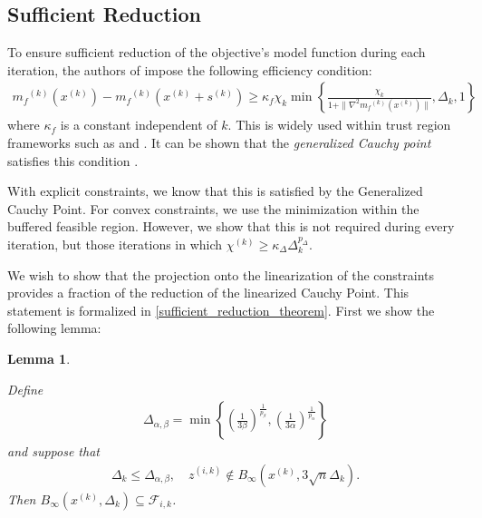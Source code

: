 \documentclass{article}
\newtheorem{lemma}[theorem]{Lemma}
\theoremstyle{case}
\newcommand{\chik}{{\chi^{(k)}}}
\newcommand{\deltalargzik}{{\Delta_{\alpha,\beta}}}
\newcommand{\dk}{\Delta_k}
\newcommand{\fik}{{\mathcal F_{i, k}}}
\newcommand{\mfk}{{{m}_f}^{(k)}}
\newcommand{\sk}{{{s}^{(k)}}}
\newcommand{\tr}{{ B_{\infty}\left(\xk, \dk\right) }}
\newcommand{\xk}{{x^{(k)}}}
\newcommand{\zik}{{z^{(i, k)}}}
\begin{document}
\subsection{Sufficient Reduction}
\label{sufficient_reduction_section}

To ensure sufficient reduction of the objective's model function during each iteration, the authors of \cite{Conejo:2013:GCT:2620806.2621814} impose the following efficiency condition:
\begin{align}
\label{efficiency}
\mfk(\xk) - \mfk(\xk + \sk) \ge \kappa_f \chi_k \min\left\{ \frac{\chi_k}{1+\|\nabla^2 \mfk(\xk)\|}, \dk, 1 \right\}
\end{align}
where $\kappa_f$ is a constant independent of $k$.
This is widely used within trust region frameworks such as \cite{Conejo:2013:GCT:2620806.2621814} and \cite{Conn:2000:TM:357813}.
It can be shown that the \emph{generalized Cauchy point} satisfies this condition \cite{Conn:2000:TM:357813}.



With explicit constraints, we know that this is satisfied by the Generalized Cauchy Point.
For convex constraints, we use the minimization within the buffered feasible region.
However, we show that this is not required during every iteration, but those iterations in which $\chik \ge \kappa_{\Delta}\dk^{p_{\Delta}}$.


We wish to show that the projection onto the linearization of the constraints provides a fraction of the reduction of the linearized Cauchy Point.
This statement is formalized in \cref{sufficient_reduction_theorem}.
First we show the following lemma:

\begin{lemma}
\label{large_zik_means_means_no_intersection}

Define
\begin{align}
\deltalargzik = \min\left\{
\left(\frac 1 {3\beta }\right)^{\frac 1 {p_{\beta }}},
\left(\frac 1 {3\alpha}\right)^{\frac 1 {p_{\alpha}}}
\right\} \label{define_deltalargzik}
\end{align}
and suppose that
\begin{align*}
\dk \le \deltalargzik, \quad \zik \not \in B_{\infty}(\xk, 3\sqrt{n}\dk).
\end{align*}
Then $\tr \subseteq \fik$.
\end{lemma}
\end{document}
